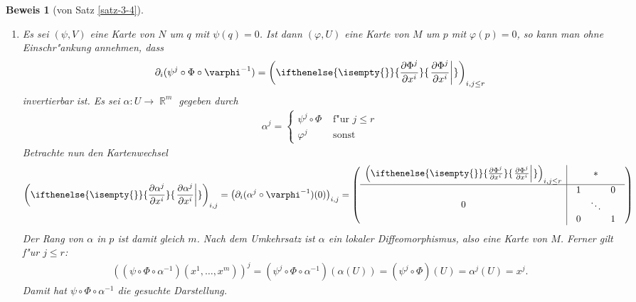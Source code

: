 \documentclass[paper=A4, twoside, chapterprefix=true, bibliography=totoc, headsepline]{scrbook}
\let\temp\phi
\let\phi\varphi
\let\varphi\temp
\let\temp\theta
\let\theta\vartheta
\let\vartheta\temp
\let\temp\epsilon
\let\epsilon\varepsilon
\let\varepsilon\temp
\let\temp\rho
\let\rho\varrho
\let\varrho\temp
\DeclareMathOperator{\R}{\mathbb{R}}
\newcommand{\pdifffrac}[3][]{\ifthenelse{\isempty{#1}}{\frac{\partial #2}{\partial #3}}{\left. \frac{\partial #2}{\partial #3} \right|_{#1}}}
\theoremstyle{plain}
\theoremstyle{nonumberplain}
\newtheorem{bew}{Beweis}
\theoremstyle{empty}
\theoremstyle{break}
\begin{document}

\begin{bew}[von Satz \ref{satz-3-4}] %
\begin{enumerate}[label=(\roman*),widest=ii,leftmargin=*]
  \item
  Es sei $(\psi, V)$ eine Karte von $N$ um $q$ mit $\psi(q) = 0$.
  Ist dann $(\phi, U)$ eine Karte von $M$ um $p$ mit $\phi(p) = 0$, so kann man ohne Einschr"ankung annehmen, dass 
  \begin{align*}
    \partial_i(\psi^j \circ \Phi \circ \phi^{-1}) = \left(\pdifffrac{\Phi^j}{x^i}\right)_{i,j \leq r} 
  \end{align*}
  invertierbar ist.
  Es sei $\alpha \colon U \to \R^m$ gegeben durch
  \begin{align*}
    \alpha^j =
    \begin{cases}
      \psi^j \circ \Phi & \text{ f"ur } j \leq r\\
      \phi^j & \text{ sonst}
    \end{cases}
  \end{align*}
  Betrachte nun den Kartenwechsel
  \begin{align*}
    \left(\pdifffrac{\alpha^j}{x^i}\right)_{i,j} = \left(\partial_i(\alpha^j \circ \phi^{-1})(0)\right)_{i,j} = \left(
      \begin{array}{c|c}
        \left(\pdifffrac{\Phi^j}{x^i}\right)_{i,j \le r} & \ast\\
        \hline
        0 & 
        \begin{array}{ccc}
          1 &&0\\
          &\ddots&\\
          0&&1
        \end{array}
      \end{array}\right)
  \end{align*}
  Der Rang von $\alpha$ in $p$ ist damit gleich $m$. Nach dem Umkehrsatz ist $\alpha$ ein lokaler Diffeomorphismus, also eine Karte von $M$. Ferner gilt f"ur $j \leq r$:
  \begin{align*}
    \left((\psi \circ \Phi \circ \alpha^{-1})(x^1,\ldots,x^m)\right)^j = (\psi^j \circ \Phi \circ \alpha^{-1})(\alpha(U)) = (\psi^j\circ \Phi)(U) = \alpha^j(U) = x^j.
  \end{align*}
  Damit hat $\psi \circ \Phi \circ \alpha^{-1}$ die gesuchte Darstellung.


\end{enumerate}
\end{bew}
\end{document}
